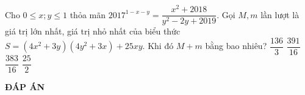 \begin{ex}%
	Cho $0 \le x;y \le 1$ thỏa mãn $2017^{1-x-y}=\dfrac{x^2+2018}{y^2-2y+2019}$. Gọi $M,m$ lần lượt là giá trị lớn nhất, giá trị nhỏ nhất của biểu thức $S=(4x^2+3y)(4y^2+3x)+25xy$. Khi đó $M+m$ bằng bao nhiêu?
	\choice
	{$\dfrac{136}{3}$}
	{\True  $\dfrac{391}{16}$}
	{$\dfrac{383}{16}$}
	{$\dfrac{25}{2}$}
\end{ex}
\newpage
\begin{center}
	\textbf{ĐÁP ÁN}
\end{center}
\begin{multicols}{10}
	 
\end{multicols}
